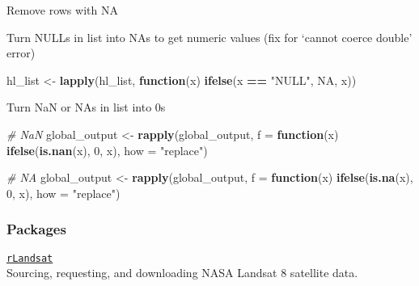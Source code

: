 \documentclass[10,portrait]{article}
\newenvironment{Shaded}{\begin{snugshade}}{\end{snugshade}}
\newcommand{\KeywordTok}[1]{\textcolor[rgb]{0.13,0.29,0.53}{\textbf{#1}}}
\newcommand{\DataTypeTok}[1]{\textcolor[rgb]{0.13,0.29,0.53}{#1}}
\newcommand{\DecValTok}[1]{\textcolor[rgb]{0.00,0.00,0.81}{#1}}
\newcommand{\StringTok}[1]{\textcolor[rgb]{0.31,0.60,0.02}{#1}}
\newcommand{\CommentTok}[1]{\textcolor[rgb]{0.56,0.35,0.01}{\textit{#1}}}
\newcommand{\OtherTok}[1]{\textcolor[rgb]{0.56,0.35,0.01}{#1}}
\newcommand{\ControlFlowTok}[1]{\textcolor[rgb]{0.13,0.29,0.53}{\textbf{#1}}}
\newcommand{\OperatorTok}[1]{\textcolor[rgb]{0.81,0.36,0.00}{\textbf{#1}}}
\newcommand{\NormalTok}[1]{#1}
\begin{document}
Remove rows with NA

\begin{Shaded}
\end{Shaded}

Turn NULLs in list into NAs to get numeric values (fix for `cannot
coerce double' error)

\begin{Shaded}
\begin{Highlighting}[]
\NormalTok{hl_list <-}\StringTok{ }\KeywordTok{lapply}\NormalTok{(hl_list, }\ControlFlowTok{function}\NormalTok{(x) }\KeywordTok{ifelse}\NormalTok{(x }\OperatorTok{==}\StringTok{ }
\StringTok{    "NULL"}\NormalTok{, }\OtherTok{NA}\NormalTok{, x))}
\end{Highlighting}
\end{Shaded}

Turn NaN or NAs in list into 0s

\begin{Shaded}
\begin{Highlighting}[]
\CommentTok{# NaN}
\NormalTok{global_output <-}\StringTok{ }\KeywordTok{rapply}\NormalTok{(global_output, }\DataTypeTok{f =} \ControlFlowTok{function}\NormalTok{(x) }\KeywordTok{ifelse}\NormalTok{(}\KeywordTok{is.nan}\NormalTok{(x), }
    \DecValTok{0}\NormalTok{, x), }\DataTypeTok{how =} \StringTok{"replace"}\NormalTok{)}

\CommentTok{# NA}
\NormalTok{global_output <-}\StringTok{ }\KeywordTok{rapply}\NormalTok{(global_output, }\DataTypeTok{f =} \ControlFlowTok{function}\NormalTok{(x) }\KeywordTok{ifelse}\NormalTok{(}\KeywordTok{is.na}\NormalTok{(x), }
    \DecValTok{0}\NormalTok{, x), }\DataTypeTok{how =} \StringTok{"replace"}\NormalTok{)}
\end{Highlighting}
\end{Shaded}

\subsubsection{Packages}\label{packages}

\href{https://blog.socialcops.com/technology/data-science/announcing-rlandsat-landsat-8-data/}{\texttt{rLandsat}}\\
Sourcing, requesting, and downloading NASA Landsat 8 satellite data.
\end{document}
